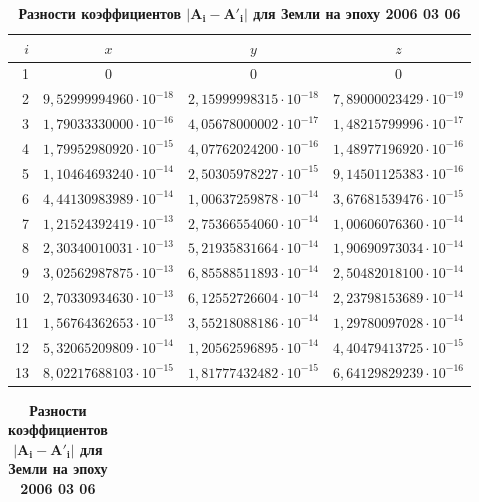 \begin{table}[p!]
\bigskip
%
\small \centering
\caption{\bf Разности коэффициентов $\boldsymbol{|A_i-A'_i|}$ для Венеры на эпоху 2006 03 06} \vspace{-3mm}
\begin{tabular}{r|c|c|c}
\hline	
\footnotesize $i$ & \footnotesize 	$x$	&\footnotesize 	$y$	&\footnotesize 	$z$	\\
\hline
\rule{0mm}{12pt}%
1	&$	0	$&$	0	$&$	0	$\\
2	&$	9,52999994960\cdot 10^{-18}	$&$	2,15999998315\cdot 10^{-18}	$&$	7,89000023429\cdot 10^{-19}	 $\\
3	&$	1,79033330000\cdot 10^{-16}	$&$	4,05678000002\cdot 10^{-17}	$&$	1,48215799996\cdot 10^{-17}	 $\\
4	&$	1,79952980920\cdot 10^{-15}	$&$	4,07762024200\cdot 10^{-16}	$&$	1,48977196920\cdot 10^{-16}	 $\\
5	&$	1,10464693240\cdot 10^{-14}	$&$	2,50305978227\cdot 10^{-15}	$&$	9,14501125383\cdot 10^{-16}	 $\\
6	&$	4,44130983989\cdot 10^{-14}	$&$	1,00637259878\cdot 10^{-14}	$&$	3,67681539476\cdot 10^{-15}	 $\\
7	&$	1,21524392419\cdot 10^{-13}	$&$	2,75366554060\cdot 10^{-14}	$&$	1,00606076360\cdot 10^{-14}	 $\\
8	&$	2,30340010031\cdot 10^{-13}	$&$	5,21935831664\cdot 10^{-14}	$&$	1,90690973034\cdot 10^{-14}	 $\\
9	&$	3,02562987875\cdot 10^{-13}	$&$	6,85588511893\cdot 10^{-14}	$&$	2,50482018100\cdot 10^{-14}	 $\\
10	&$	2,70330934630\cdot 10^{-13}	$&$	6,12552726604\cdot 10^{-14}	$&$	2,23798153689\cdot 10^{-14}	$\\
11	&$	1,56764362653\cdot 10^{-13}	$&$	3,55218088186\cdot 10^{-14}	$&$	1,29780097028\cdot 10^{-14}	$\\
12	&$	5,32065209809\cdot 10^{-14}	$&$	1,20562596895\cdot 10^{-14}	$&$	4,40479413725\cdot 10^{-15}	$\\
13	&$	8,02217688103\cdot 10^{-15}	$&$	1,81777432482\cdot 10^{-15}	$&$	6,64129829239\cdot 10^{-16}	$\\
\hline
\end{tabular}
\bigskip
%
%
%
\small \centering
\caption{\bf Разности коэффициентов $\boldsymbol{|A_i-A'_i|}$ для Земли на эпоху 2006 03 06}\vspace{-3mm}
\begin{tabular}{r|c|c|c}

\end{tabular}
\end{table}
